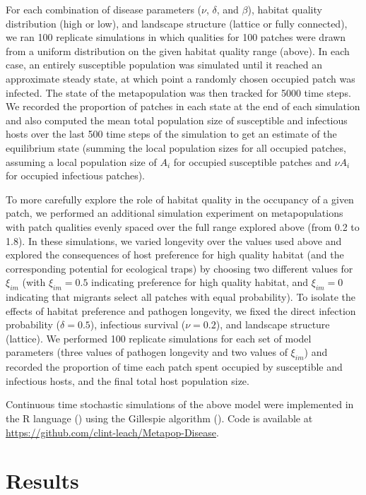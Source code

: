 \documentclass{article}
\begin{document}
For each combination of disease parameters ($\nu$, $\delta$, and $\beta$), habitat quality distribution (high or low), and landscape structure (lattice or fully connected), we ran 100 replicate simulations in which qualities for 100 patches were drawn from a uniform distribution on the given habitat quality range (above). In each case, an entirely susceptible population was simulated until it reached an approximate steady state, at which point a randomly chosen occupied patch was infected.  The state of the metapopulation was then tracked for 5000 time steps.  We recorded the proportion of patches in each state at the end of each simulation and also computed the mean total population size of susceptible and infectious hosts over the last 500 time steps of the simulation to get an estimate of the equilibrium state (summing the local population sizes for all occupied patches, assuming a local population size of $A_i$ for occupied susceptible patches and $\nu A_i$ for occupied infectious patches).    

To more carefully explore the role of habitat quality in the occupancy of a given patch, we performed an additional simulation experiment on metapopulations with patch qualities evenly spaced over the full range explored above (from 0.2 to 1.8).
In these simulations, we varied longevity over the values used above and explored the consequences of host preference for high quality habitat (and the corresponding potential for ecological traps) by choosing two different values for $\xi_{im}$ (with $\xi_{im} = 0.5$ indicating preference for high quality habitat, and  $\xi_{im} = 0$ indicating that migrants select all patches with equal probability).  
To isolate the effects of habitat preference and pathogen longevity, we fixed the direct infection probability ($\delta = 0.5$), infectious survival ($\nu = 0.2$), and landscape structure (lattice).
We performed 100 replicate simulations for each set of model parameters (three values of pathogen longevity and two values of $\xi_{im}$) and recorded the proportion of time each patch spent occupied by susceptible and infectious hosts, and the final total host population size.

Continuous time stochastic simulations of the above model were implemented in the R language (\cite{R2014}) using the Gillespie algorithm (\cite{Gillespie1977}).  Code is available at \\
\url{https://github.com/clint-leach/Metapop-Disease}.

\section{Results}
\label{results}
\end{document}
